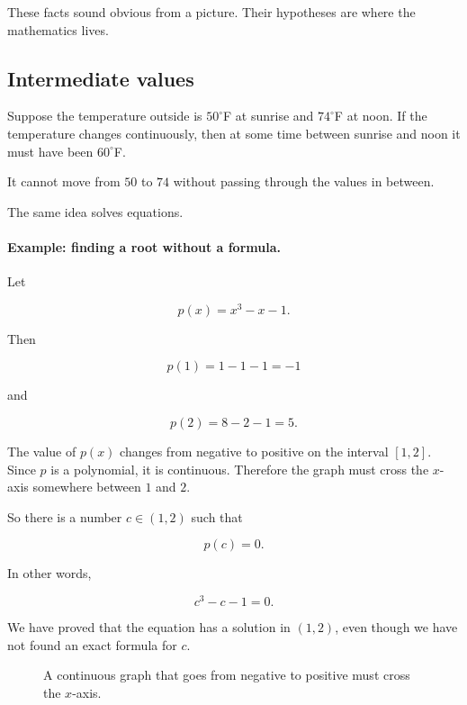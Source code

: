 These facts sound obvious from a picture.  Their hypotheses are where the mathematics lives.

\subsection{Intermediate values}
\label{subsec:intermediate-values}

Suppose the temperature outside is \(50^\circ\)F at sunrise and \(74^\circ\)F at noon.  If the temperature changes continuously, then at some time between sunrise and noon it must have been \(60^\circ\)F.

It cannot move from \(50\) to \(74\) without passing through the values in between.

The same idea solves equations.

\paragraph{Example: finding a root without a formula.}
Let

\[
p(x)=x^3-x-1.
\]

Then

\[
p(1)=1-1-1=-1
\]

and

\[
p(2)=8-2-1=5.
\]

The value of \(p(x)\) changes from negative to positive on the interval \([1,2]\).  Since \(p\) is a polynomial, it is continuous.  Therefore the graph must cross the \(x\)-axis somewhere between \(1\) and \(2\).

So there is a number \(c\in(1,2)\) such that

\[
p(c)=0.
\]

In other words,

\[
c^3-c-1=0.
\]

We have proved that the equation has a solution in \((1,2)\), even though we have not found an exact formula for \(c\).

\begin{figure}[h]
\centering
{}
\caption{A continuous graph that goes from negative to positive must cross the \(x\)-axis.}
\label{fig:ivt-root-cubic}
\end{figure}

